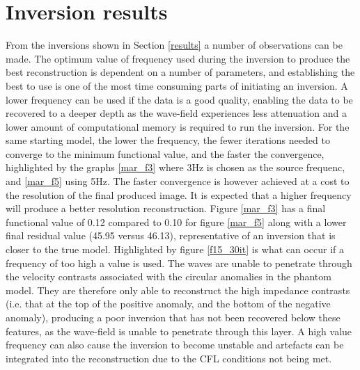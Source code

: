 \section{Inversion results}
From the inversions shown in Section \ref{results} a number of observations can be made. The optimum value of frequency used during the inversion to produce the best reconstruction is dependent on a number of parameters, and establishing the best to use is one of the most time consuming parts of initiating an inversion. 
A lower frequency can be used if the data is a good quality, enabling the data to be recovered to a deeper depth as the wave-field experiences less attenuation and a lower amount of computational memory is required to run the inversion. For the same starting model, the lower the frequency, the fewer iterations needed to converge to the minimum functional value, and the faster the convergence, highlighted by the graphs \ref{mar_f3} where 3Hz is chosen as the source frequenc, and \ref{mar_f5} using 5Hz. The faster convergence is however achieved at a cost to the resolution of the final produced image. It is expected that a higher frequency will produce a better resolution reconstruction. Figure \ref{mar_f3} has a final functional value of 0.12 compared to 0.10 for figure \ref{mar_f5} along with a lower final residual value (45.95 versus 46.13), representative of an inversion that is closer to the true model. 
Highlighted by figure \ref{f15_30it} is what can occur if a frequency of too high a value is used. The waves are unable to penetrate through the velocity contrasts associated with the circular anomalies in the phantom model. They are therefore only able to reconstruct the high impedance contrasts (i.e. that at the top of the positive anomaly, and the bottom of the negative anomaly), producing a poor inversion that has not been recovered below these features, as the wave-field is unable to penetrate through this layer. A high value frequency can also cause the inversion to become unstable and artefacts can be integrated into the reconstruction due to the CFL conditions not being met. \par

